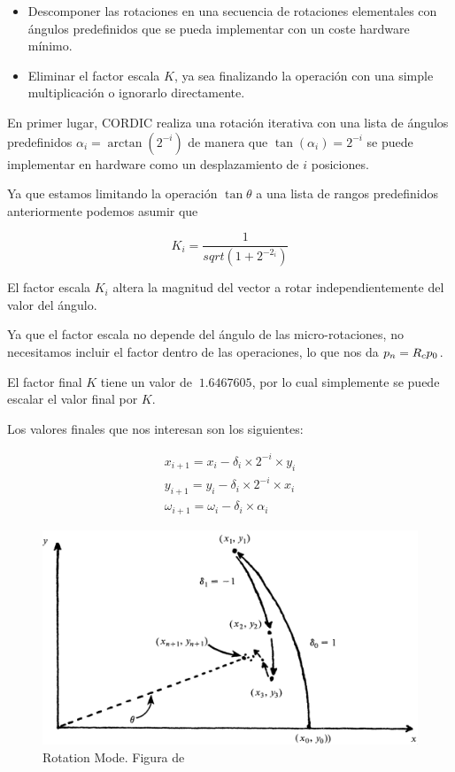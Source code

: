 \begin{itemize}
	\item Descomponer las rotaciones en una secuencia de rotaciones elementales con ángulos predefinidos que se pueda implementar con un coste hardware mínimo.
	\item Eliminar el factor escala $K$, ya sea finalizando la operación con una simple multiplicación o ignorarlo directamente.
\end{itemize}

En primer lugar, CORDIC realiza una rotación iterativa con una lista de ángulos predefinidos $\alpha_{i} = \arctan({2^{-i}})$ de manera que $\tan({\alpha_{i}}) = 2^{-i}$ se puede implementar en hardware como un desplazamiento de $i$ posiciones.

Ya que estamos limitando la operación $\tan{\theta}$ a una lista de rangos predefinidos anteriormente podemos asumir que

\[
	K_{i} = \frac{1}{sqrt{(1+2^{-2_{i}})}}
\]

El factor escala $K_{i}$ altera la magnitud del vector a rotar independientemente del valor del ángulo. 

Ya que el factor escala no depende del ángulo de las micro-rotaciones, no necesitamos incluir el factor dentro de las operaciones, lo que nos da $\boldmath{p_{n} = R_{c}p_{0}}$.

El factor final $K$ tiene un valor de $~1.6467605$, por lo cual simplemente se puede escalar el valor final por $K$.

Los valores finales que nos interesan son los siguientes:

\[
\begin{matrix}
	x_{i+1} = x_{i} - \delta_{i} \times 2^{-i} \times y_{i} \\
	y_{i+1} = y_{i} - \delta_{i} \times 2^{-i} \times x_{i} \\
	\omega_{i+1} =  \omega_{i} - \delta_{i} \times \alpha_{i}
\end{matrix}
\]

\begin{figure}[ht]
	\centering
	\includegraphics[width=\textwidth]{archivos/CORDIC/RotationMode.png}
	\caption{Rotation Mode. Figura de \cite{schelin_calculator_1983}}
	\label{graf:RM}
\end{figure}

